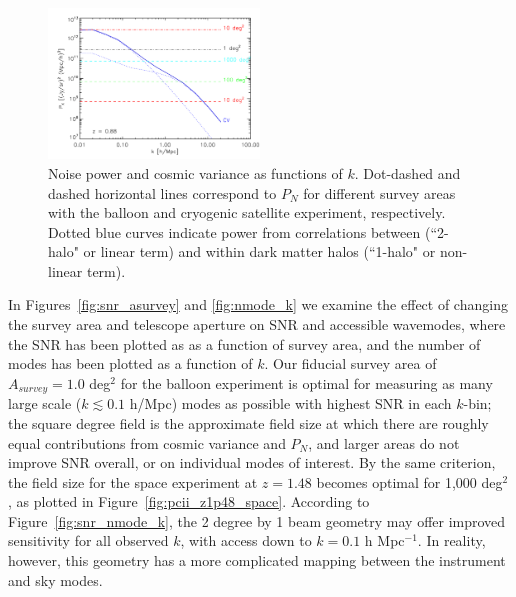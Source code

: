 \documentclass[iop]{emulateapj}
\begin{document}
\begin{figure}[h]
\centering
\includegraphics[width=0.5\textwidth]{pcii_pnoise_k_z88}
\caption{Noise power and cosmic variance as functions of $k$. Dot-dashed and dashed horizontal lines correspond to $P_N$ for different survey areas with the balloon and cryogenic satellite experiment, respectively. Dotted blue curves indicate power from correlations between (``2-halo" or linear term) and within dark matter halos (``1-halo" or non-linear term).}
\label{fig:pcii_pnoise}
\end{figure}

In Figures~\ref{fig:snr_asurvey} and \ref{fig:nmode_k} we examine the effect of changing the survey area and telescope aperture on SNR and accessible wavemodes, where the SNR has been plotted as as a function of survey area, and the number of modes has been plotted as a function of $k$. Our fiducial survey area of $A_{survey} = 1.0$ deg$^2$ for the balloon experiment is optimal for measuring as many large scale ($k\lesssim0.1$ h/Mpc) modes as possible with highest SNR in each $k$-bin; the square degree field is the approximate field size at which there are roughly equal contributions from cosmic variance and $P_N$, and larger areas do not improve SNR overall, or on individual modes of interest. By the same criterion, the field size for the space experiment at $z = 1.48$ becomes optimal for 1,000 deg$^2$, as plotted in Figure~\ref{fig:pcii_z1p48_space}. According to Figure~\ref{fig:snr_nmode_k}, the 2 degree by 1 beam geometry may offer improved sensitivity for all observed $k$, with access down to $k=0.1$ h Mpc$^{-1}$. In reality, however, this geometry has a more complicated mapping between the instrument and sky modes. 
\end{document}

